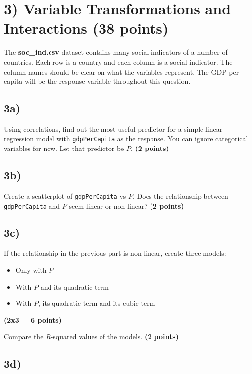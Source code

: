 \documentclass[
  letterpaper,
  DIV=11,
  numbers=noendperiod]{scrreprt}
\providecommand{\tightlist}{%
  \setlength{\itemsep}{0pt}\setlength{\parskip}{0pt}}\usepackage{longtable,booktabs,array}
\begin{document}
\section{3) Variable Transformations and Interactions (38
points)}\label{variable-transformations-and-interactions-38-points}

The \textbf{soc\_ind.csv} dataset contains many social indicators of a
number of countries. Each row is a country and each column is a social
indicator. The column names should be clear on what the variables
represent. The GDP per capita will be the response variable throughout
this question.

\subsection{3a)}\label{a-7}

Using correlations, find out the most useful predictor for a simple
linear regression model with \texttt{gdpPerCapita} as the response. You
can ignore categorical variables for now. Let that predictor be \(P\).
\textbf{(2 points)}

\subsection{3b)}\label{b-7}

Create a scatterplot of \texttt{gdpPerCapita} vs \(P\). Does the
relationship between \texttt{gdpPerCapita} and \(P\) seem linear or
non-linear? \textbf{(2 points)}

\subsection{3c)}\label{c-5}

If the relationship in the previous part is non-linear, create three
models:

\begin{itemize}
\tightlist
\item
  Only with \(P\)
\item
  With \(P\) and its quadratic term
\item
  With \(P\), its quadratic term and its cubic term
\end{itemize}

\textbf{(2x3 = 6 points)}

Compare the \(R\)-squared values of the models. \textbf{(2 points)}

\subsection{3d)}\label{d-4}
\end{document}
